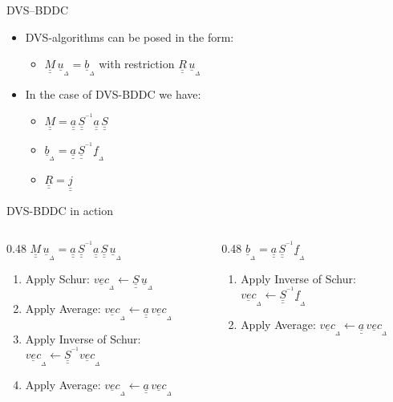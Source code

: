 \documentclass[handout]{beamer}
\newcommand{\Matriz}[1]{\underline{\underline{#1}}}
\newcommand{\InvSchur}{\Matriz{S}^{^{-1}}}
\newcommand{\Schur}{\Matriz{S}}
\newcommand{\VectorD}[1]{\underline{#1}_{_\Delta}}
\begin{document}
\begin{frame}{DVS--BDDC}

\begin{itemize}

\item DVS-algorithms can be posed in the form:
\begin{itemize}
\item $\Matriz{M} \, \VectorD{u} = \VectorD{b}$ with restriction $\Matriz{R} \, \VectorD{u}$
\end{itemize}

\item In the case of DVS-BDDC we have:
\begin{itemize}
\item $\Matriz{M}  = \Matriz{a} \, \InvSchur  \Matriz{a} \, \Schur $
\item $\VectorD{b} = \Matriz{a} \, \InvSchur \VectorD{f}$
\item $\Matriz{R} = \Matriz{j}$
\end{itemize}

\end{itemize}

\begin{exampleblock}{DVS-BDDC in action}

\begin{columns}
\begin{column}{0.48\textwidth}
$\boxed{\Matriz{M} \, \VectorD{u} = \Matriz{a} \, \InvSchur  \Matriz{a} \, \Schur \, \VectorD{u}}$
\begin{enumerate}[<+->]
\item {\scriptsize{Apply Schur: $\VectorD{vec} \leftarrow \Schur \, \VectorD{u}$}}
\item {\scriptsize{Apply Average: $\VectorD{vec} \leftarrow \Matriz{a} \, \VectorD{vec}$}}
\item {\scriptsize{Apply Inverse of Schur: $\VectorD{vec} \leftarrow\InvSchur \VectorD{vec} $}}
\item {\scriptsize{Apply Average: $\VectorD{vec} \leftarrow \Matriz{a} \, \VectorD{vec}$}}
\end{enumerate}
\end{column}
\begin{column}{0.48\textwidth}
$\boxed{\VectorD{b} = \Matriz{a} \, \InvSchur \VectorD{f}}$
\begin{enumerate}[<+->]
\item {\scriptsize{Apply Inverse of Schur: $\VectorD{vec} \leftarrow\InvSchur \VectorD{f} $}}
\item {\scriptsize{Apply Average: $\VectorD{vec} \leftarrow \Matriz{a} \, \VectorD{vec}$}}
\end{enumerate}
\end{column}
\end{columns}
\end{exampleblock}

\end{frame}
\end{document}
